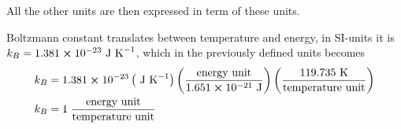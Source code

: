 \documentclass[11pt]{article}
\begin{document}
	All the other units are then expressed in term of these units.

	Boltzmann constant translates between temperature and energy, in SI-units it is \( k_B = 1.381 \cross 10^{-23} \text{ J K}^{-1}\), which in the previously defined units becomes
	\begin{align}
	k_B &= 1.381 \cross 10^{-23}  \left(\text{ J K}^{-1}\right)  \left(\frac{\text{energy unit}}{1.651 \cross 10^{-21} \text{ J}}\right)
	\left( \frac{119.735 \text{ K}}{\text{temperature unit}} \right)
	\\
	k_B &= 1 \; \frac{\text{energy unit}}{\text{temperature unit}}
	\end{align}


































\end{document}
